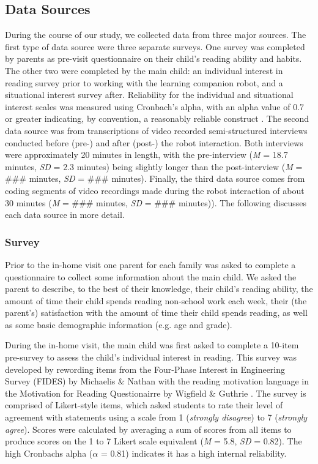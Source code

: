\documentclass{sigchi}
\begin{document}
\subsection{Data Sources}
  During the course of our study, we collected data from three major sources. The first type of data source were three separate surveys. One survey was completed by parents as pre-visit questionnaire on their child's reading ability and habits. The other two were completed by the main child: an individual interest in reading survey prior to working with the learning companion robot, and a situational interest survey after. Reliability for the individual and situational interest scales was measured using Cronbach’s alpha, with an alpha value of 0.7 or greater indicating, by convention, a reasonably reliable construct \cite{Crocker:2009}. The second data source was from transcriptions of video recorded semi-structured interviews conducted before (pre-) and after (post-) the robot interaction. Both interviews were approximately 20 minutes in length, with the pre-interview (\textit{M} = 18.7 minutes, \textit{SD} = 2.3 minutes) being slightly longer than the post-interview (\textit{M} = \#\#\# minutes, \textit{SD} = \#\#\# minutes). Finally, the third data source comes from coding segments of video recordings made during the robot interaction of about 30 minutes (\textit{M} = \#\#\# minutes, \textit{SD} = \#\#\# minutes)). The following discusses each data source in more detail.
  
\subsubsection{Survey}

  Prior to the in-home visit one parent for each family was asked to complete a questionnaire to collect some information about the main child. We asked the parent to describe, to the best of their knowledge, their child's reading ability, the amount of time their child spends reading non-school work each week, their (the parent's) satisfaction with the amount of time their child spends reading, as well as some basic demographic information (e.g. age and grade).
 
  During the in-home visit, the main child was first asked to complete a 10-item pre-survey to assess the child's individual interest in reading. This survey was developed by rewording items from the Four-Phase Interest in Engineering Survey (FIDES) by Michaelis \& Nathan \cite{Michaelis:2015} with the reading motivation language in the Motivation for Reading Questionairre by Wigfield \& Guthrie \cite{Wigfield:1997}. The survey is comprised of Likert-style items, which asked students to rate their level of agreement with statements using a scale from 1 (\textit{strongly disagree}) to 7 (\textit{strongly agree}). Scores were calculated by averaging a sum of scores from all items to produce scores on the 1 to 7 Likert scale equivalent (\textit{M} = 5.8, \textit{SD} = 0.82). The high Cronbachs alpha ($\alpha$ = 0.81) indicates it has a high internal reliability.
 
\end{document}
